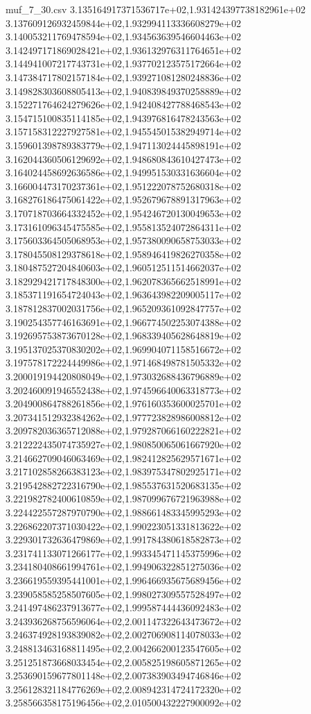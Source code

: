 \begin{filecontents*}{muf_7_30.csv}
3.135164917371536717e+02,1.931424397738182961e+02
3.137609126932459844e+02,1.932994113336608279e+02
3.140053211769478594e+02,1.934563639546604463e+02
3.142497171869028421e+02,1.936132976311764651e+02
3.144941007217743731e+02,1.937702123575172664e+02
3.147384717802157184e+02,1.939271081280248836e+02
3.149828303608805413e+02,1.940839849370258889e+02
3.152271764624279626e+02,1.942408427788468543e+02
3.154715100835114185e+02,1.943976816478243563e+02
3.157158312227927581e+02,1.945545015382949714e+02
3.159601398789383779e+02,1.947113024445898191e+02
3.162044360506129692e+02,1.948680843610427473e+02
3.164024458692636586e+02,1.949951530331636604e+02
3.166004473170237361e+02,1.951222078752680318e+02
3.168276186475061422e+02,1.952679678891317963e+02
3.170718703664332452e+02,1.954246720130049653e+02
3.173161096345475585e+02,1.955813524072864311e+02
3.175603364505068953e+02,1.957380090658753033e+02
3.178045508129378618e+02,1.958946419826270358e+02
3.180487527204840603e+02,1.960512511514662037e+02
3.182929421717848300e+02,1.962078365662518991e+02
3.185371191654724043e+02,1.963643982209005117e+02
3.187812837002031756e+02,1.965209361092847757e+02
3.190254357746163691e+02,1.966774502253074388e+02
3.192695753873670128e+02,1.968339405628648819e+02
3.195137025370830202e+02,1.969904071158516672e+02
3.197578172224449986e+02,1.971468498781505332e+02
3.200019194420808049e+02,1.973032688436796889e+02
3.202460091946552438e+02,1.974596640063318773e+02
3.204900864788261856e+02,1.976160353600025701e+02
3.207341512932384262e+02,1.977723828986008812e+02
3.209782036365712088e+02,1.979287066160222821e+02
3.212222435074735927e+02,1.980850065061667920e+02
3.214662709046063469e+02,1.982412825629571671e+02
3.217102858266383123e+02,1.983975347802925171e+02
3.219542882722316790e+02,1.985537631520683135e+02
3.221982782400610859e+02,1.987099676721963988e+02
3.224422557287970790e+02,1.988661483345995293e+02
3.226862207371030422e+02,1.990223051331813622e+02
3.229301732636479869e+02,1.991784380618582873e+02
3.231741133071266177e+02,1.993345471145375996e+02
3.234180408661994761e+02,1.994906322851275036e+02
3.236619559395441001e+02,1.996466935675689456e+02
3.239058585258507605e+02,1.998027309557528497e+02
3.241497486237913677e+02,1.999587444436092483e+02
3.243936268756596064e+02,2.001147322643473672e+02
3.246374928193839082e+02,2.002706908114078033e+02
3.248813463168811495e+02,2.004266200123547605e+02
3.251251873668033454e+02,2.005825198605871265e+02
3.253690159677801148e+02,2.007383903494746846e+02
3.256128321184776269e+02,2.008942314724172320e+02
3.258566358175196456e+02,2.010500432227900092e+02

\end{filecontents*}

